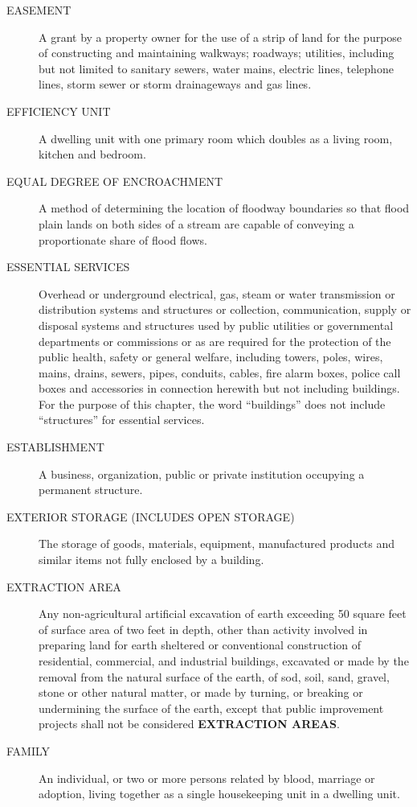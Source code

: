 \begin{description}
    \item[EASEMENT] A grant by a property owner for the use of a strip of land for the purpose of constructing and maintaining walkways; roadways; utilities, including but not limited to sanitary sewers, water mains, electric lines, telephone lines, storm sewer or storm drainageways and gas lines.
    \item[EFFICIENCY UNIT] A dwelling unit with one primary room which doubles as a living room, kitchen and bedroom.
    \item[EQUAL DEGREE OF ENCROACHMENT] A method of determining the location of floodway boundaries so that flood plain lands on both sides of a stream are capable of conveying a proportionate share of flood flows.
    \item[ESSENTIAL SERVICES] Overhead or underground electrical, gas, steam or water transmission or distribution systems and structures or collection, communication, supply or disposal systems and structures used by public utilities or governmental departments or commissions or as are required for the protection of the public health, safety or general welfare, including towers, poles, wires, mains, drains, sewers, pipes, conduits, cables, fire alarm boxes, police call boxes and accessories in connection herewith but not including buildings.  For the purpose of this chapter, the word “buildings” does not include “structures” for essential services.
    \item[ESTABLISHMENT] A business, organization, public or private institution occupying a permanent structure.
    \item[EXTERIOR STORAGE (INCLUDES OPEN STORAGE)] The storage of goods, materials, equipment, manufactured products and similar items not fully enclosed by a building.
    \item[EXTRACTION AREA] Any non-agricultural artificial excavation of earth exceeding 50 square feet of surface area of two feet in depth, other than activity involved in preparing land for earth sheltered or conventional construction of residential, commercial, and industrial buildings, excavated or made by the removal from the natural surface of the earth, of sod, soil, sand, gravel, stone or other natural matter, or made by turning, or breaking or undermining the surface of the earth, except that public improvement projects shall not be considered \textbf{EXTRACTION AREAS}.
    \item[FAMILY] An individual, or two or more persons related by blood, marriage or adoption, living together as a single housekeeping unit in a dwelling unit.

\end{description}
